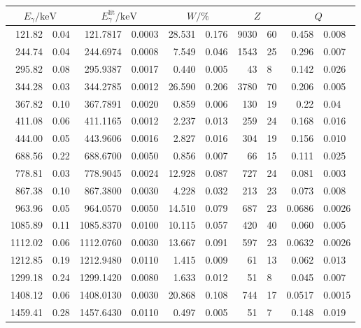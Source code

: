 \label{tab:a2}
	\begin{tabular}{r@{${}\pm{}$}lr@{${}\pm{}$}lr@{${}\pm{}$}lr@{${}\pm{}$}lr@{${}\pm{}$}l}
		\toprule
		\multicolumn{2}{c}{$E_\gamma/\si{\kilo\electronvolt}$} & \multicolumn{2}{c}{$E_\gamma^{\text{lit}}/\si{\kilo\electronvolt}$} & \multicolumn{2}{c}{$W/\si{\percent}$} & \multicolumn{2}{c}{$Z$} & \multicolumn{2}{c}{$Q$} \\
		\midrule
		121.82  & 0.04 & 121.7817  & 0.0003 & 28.531 & 0.176 & 9030 & 60 & 0.458  & 0.008  \\
		244.74  & 0.04 & 244.6974  & 0.0008 & 7.549  & 0.046 & 1543 & 25 & 0.296  & 0.007  \\
		295.82  & 0.08 & 295.9387  & 0.0017 & 0.440  & 0.005 &   43 &  8 & 0.142  & 0.026  \\
		344.28  & 0.03 & 344.2785  & 0.0012 & 26.590 & 0.206 & 3780 & 70 & 0.206  & 0.005  \\
		367.82  & 0.10 & 367.7891  & 0.0020 & 0.859  & 0.006 &  130 & 19 & 0.22   & 0.04   \\
		411.08  & 0.06 & 411.1165  & 0.0012 & 2.237  & 0.013 &  259 & 24 & 0.168  & 0.016  \\
		444.00  & 0.05 & 443.9606  & 0.0016 & 2.827  & 0.016 &  304 & 19 & 0.156  & 0.010  \\
		688.56  & 0.22 & 688.6700  & 0.0050 & 0.856  & 0.007 &   66 & 15 & 0.111  & 0.025  \\
		778.81  & 0.03 & 778.9045  & 0.0024 & 12.928 & 0.087 &  727 & 24 & 0.081  & 0.003  \\
		867.38  & 0.10 & 867.3800  & 0.0030 & 4.228  & 0.032 &  213 & 23 & 0.073  & 0.008  \\
		963.96  & 0.05 & 964.0570  & 0.0050 & 14.510 & 0.079 &  687 & 23 & 0.0686 & 0.0026 \\
		1085.89 & 0.11 & 1085.8370 & 0.0100 & 10.115 & 0.057 &  420 & 40 & 0.060 & 0.005  \\
		1112.02 & 0.06 & 1112.0760 & 0.0030 & 13.667 & 0.091 &  597 & 23 & 0.0632 & 0.0026 \\
		1212.85 & 0.19 & 1212.9480 & 0.0110 & 1.415  & 0.009 &   61 & 13 & 0.062  & 0.013 \\
		1299.18 & 0.24 & 1299.1420 & 0.0080 & 1.633  & 0.012 &   51 &  8 & 0.045  & 0.007 \\
		1408.12 & 0.06 & 1408.0130 & 0.0030 & 20.868 & 0.108 &  744 & 17 & 0.0517 & 0.0015 \\
		1459.41 & 0.28 & 1457.6430 & 0.0110 & 0.497  & 0.005 &   51 &  7 & 0.148  & 0.019 \\
		\bottomrule
	\end{tabular}

